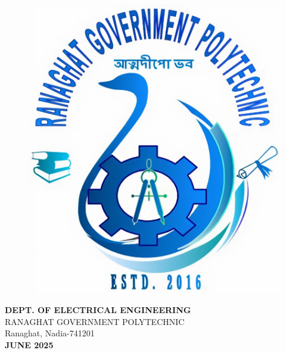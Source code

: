 \documentclass[12pt,a4paper]{report}
\begin{document}
\begin{center}
\begin{figure}[H]
    \centering
    \includegraphics[scale=0.1]{images/institute_logo.png}
    \label{fig:institute_logo}
\end{figure}
\textbf{DEPT. OF ELECTRICAL ENGINEERING}\\

RANAGHAT GOVERNMENT POLYTECHNIC\\

Ranaghat, Nadia-741201 \\
\textbf{JUNE 2025}\\
\end{center}

\thispagestyle{empty}

\newpage



\newpage

\end{document}

